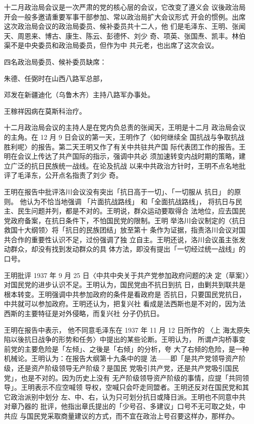 十二月政治局会议是一次严肃的党的核心层的会议，它改变了遵义会
议後政治局开会一般多邀请重要军事干部参加、常以政治局扩大会议形式
开会的惯例。出席这次政治局会议的政治局委员、候补委员共十二人，他
们是毛泽东、王明、张闻天、周恩来、博古、康生、陈云、彭德怀、刘少
奇、项英、张国焘、凯丰。林伯渠不是中央委员和政治局委员，但作为中
共元老，也出席了这次会议。

四名政治局委员、候补委员缺席：

朱德、任弼时在山西八路军总部，

邓发在新疆迪化（乌鲁木齐）主持八路军办事处。

王稼祥因病在莫斯科治疗。

十二月政治局会议的主持人是在党内负总责的张闻天，王明是十二月
政治局会议的主角。在 12 月 9 日会议的第一天，王明作了〈如何继续全
国抗战与争取抗战胜利呢〉的报告。第二天王明又作了有关中共驻共产国
际代表团工作的报告。王明在会议上传达了共产国际的指示，强调中共必
须加速转变内战时期的策略，建立广泛的抗日民族统一战线。在论及抗战
以来中共政治方针时，王明不点名地批评了毛泽东，公开点名指责了刘少
奇。

王明在报告中批评洛川会议没有突出「抗日高于一切」、「一切服从
抗日」
的原则。
他认为不恰当地强调
「片面抗战路线」 和「全面抗战路线」，
将抗日与民主、民生问题并列，都是不对的。王明说，群众运动要取得合
法地位，应去国民党政府备案，在抗日条件下，不怕国民党的限制。王明
举洛川会议制定的〈抗日救国十大纲领〉将「抗日的民族团结」放至第十
条作为证据，指责洛川会议对国共合作的重要性认识不足，过份强调了独
立自主。王明还说，洛川会议虽主张发动群众，却没有找到发动群众的具
体方法，即没有提出「一切经过统一战线」的口号。

王明批评 1937 年 9 月 25 日〈中共中央关于共产党参加政府问题的决
定（草案）〉对国民党的进步认识不足。王明认为，国民党由不抗日到抗
日，由剿共到联共是根本转变。王明强调中共参加政府的条件是看政府是
否抗日，只要国民党抗日，中共就可以参加政府。王明还认为，把复兴社
看成是法西斯也是不对的，因为法西斯的主要特征是对外侵略，而复兴社
分子仍抗日。

王明在报告中表示，
他不同意毛泽东在 1937 年 11 月 12 日所作的
〈上
海太原失陷以後抗日战争的形势和任务〉中提出的某些论断。王明认为，
所谓卢沟桥事变前党的主要危险是「左倾」、之後是「右倾」的分析，夸
大了右倾的危险，是一种机械论。王明认为：在报告大纲第十九条中的提
法——即「是共产党领导资产阶级，还是资产阶级领导无产阶级？是国民
党吸引共产党，还是共产党吸引国民党」，也是不对的。因为历史上没有
无产阶级领导资产阶级的事情，应提「共同领导」。王明表示不应空喊领
导权，空喊只会吓走同盟者。王明还反对在国民党和其它政治派别中划分
左、中、右，认为只可划分抗日或降日派。王明也不同意中共对章乃器的
批评，他指出章氏提出的「少号召、多建议」口号不无可取之处，中共应
与国民党采取商量建议的方式，而不宜在政治上号召要这样办，那样办。

